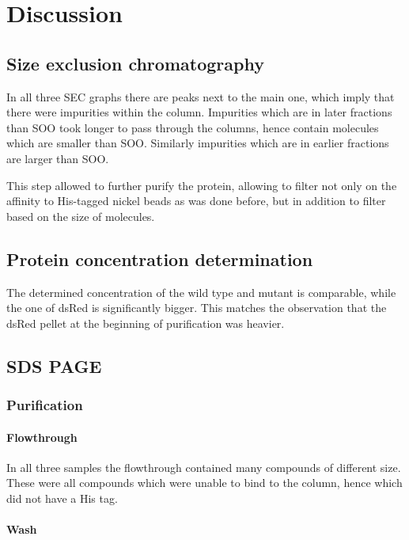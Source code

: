 \chapter{Discussion}

\section{Size exclusion chromatography}

In all three SEC graphs there are peaks next to the main one, which imply that
there were impurities within the column. Impurities which are in later
fractions than SOO took longer to pass through the columns, hence contain
molecules which are smaller than SOO. Similarly impurities which are in earlier
fractions are larger than SOO.

This step allowed to further purify the protein, allowing to filter not only on
the affinity to His-tagged nickel beads as was done before, but in addition to
filter based on the size of molecules.

\section{Protein concentration determination}

The determined concentration of the wild type and mutant is comparable, while
the one of dsRed is significantly bigger. This matches the observation that the
dsRed pellet at the beginning of purification was heavier.

\section{SDS PAGE}

\subsection{Purification}

\subsubsection{Flowthrough}

In all three samples the flowthrough contained many compounds of different
size. These were all compounds which were unable to bind to the column, hence
which did not have a His tag.

\subsubsection{Wash}


